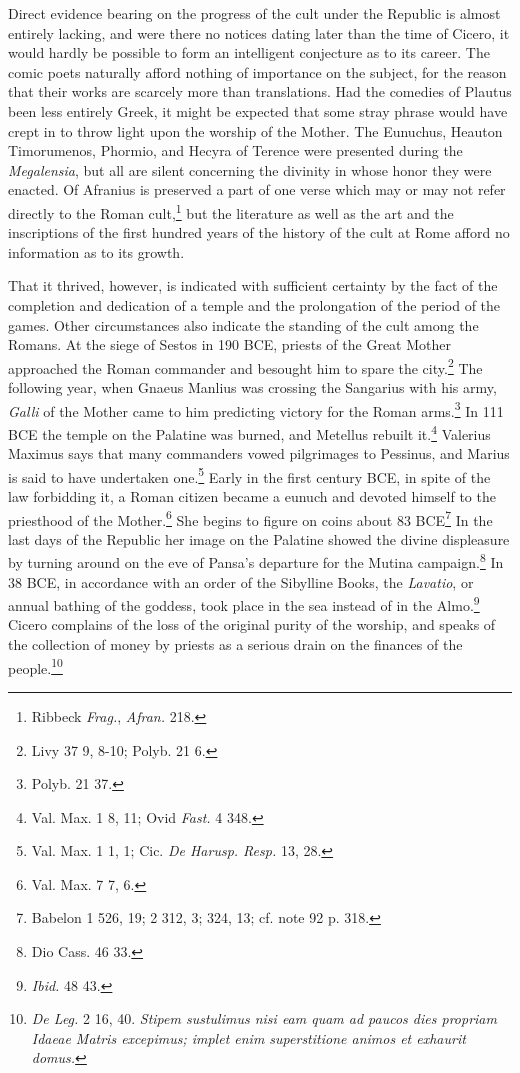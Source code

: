 \documentclass[a4paper, 11pt, oneside, polutonikogreek, french]{article}
\begin{document}
Direct evidence bearing on the progress of the cult under the Republic is almost entirely lacking, and were there no notices dating later than the time of Cicero, it would hardly be possible to form an intelligent conjecture as to its career. The comic poets naturally afford nothing of importance on the subject, for the reason that their works are scarcely more than translations. Had the comedies of Plautus been less entirely Greek, it might be expected that some stray phrase would have crept in to throw light upon the worship of the Mother. The Eunuchus, Heauton Timorumenos, Phormio, and Hecyra of Terence were presented during the \emph{Megalensia}, but all are silent concerning the divinity in whose honor they were enacted. Of Afranius is preserved a part of one verse which may or may not refer directly to the Roman cult,\footnote{Ribbeck \emph{Frag.}, \emph{Afran.} 218.} but the literature as well as the art and the inscriptions of the first hundred years of the history of the cult at Rome afford no information as to its growth.

That it thrived, however, is indicated with sufficient certainty by the fact of the completion and dedication of a temple and the prolongation of the period of the games. Other circumstances also indicate the standing of the cult among the Romans. At the siege of Sestos in 190 \textsc{BCE}, priests of the Great Mother approached the Roman commander and besought him to spare the city.\footnote{Livy 37 9, 8-10; Polyb. 21 6.} The following year, when Gnaeus Manlius was crossing the Sangarius with his army, \emph{Galli} of the Mother came to him predicting victory for the Roman arms.\footnote{Polyb. 21 37.} In 111 \textsc{BCE} the temple on the Palatine was burned, and Metellus rebuilt it.\footnote{Val. Max. 1 8, 11; Ovid \emph{Fast.} 4 348.} Valerius Maximus says that many commanders vowed pilgrimages to Pessinus, and Marius is said to have undertaken one.\footnote{Val. Max. 1 1, 1; Cic. \emph{De Harusp. Resp.} 13, 28.} Early in the first century \textsc{BCE}, in spite of the law forbidding it, a Roman citizen became a eunuch and devoted himself to the priesthood of the Mother.\footnote{Val. Max. 7 7, 6.} She begins to figure on coins about 83 \textsc{BCE}\footnote{Babelon 1 526, 19; 2 312, 3; 324, 13; cf. note 92 p. 318.} In the last days of the Republic her image on the Palatine showed the divine displeasure by turning around on the eve of Pansa's departure for the Mutina campaign.\footnote{Dio Cass. 46 33.} In 38 \textsc{BCE}, in accordance with an order of the Sibylline Books, the \emph{Lavatio}, or annual bathing of the goddess, took place in the sea instead of in the Almo.\footnote{\emph{Ibid.} 48 43.} Cicero complains of the loss of the original purity of the worship, and speaks of the collection of money by priests as a serious drain on the finances of the people.\footnote{\emph{De Leg.} 2 16, 40. \emph{Stipem sustulimus nisi eam quam ad paucos dies propriam Idaeae Matris excepimus; implet enim superstitione animos et exhaurit domus.}}
\end{document}
